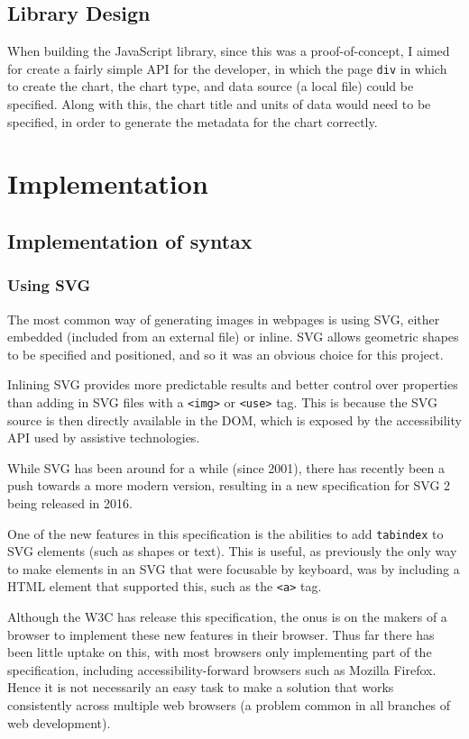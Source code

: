 \documentclass[ %
                    author={Aleena Baig},
                supervisor={Dr Simon Lock},
                    degree={BSc},
                     title={On Making Web Accessible Graphs},
                  subtitle={},
                      year={2019} ]{dissertation}
\begin{document}
\section{Library Design}

When building the JavaScript library, since this was a proof-of-concept, I aimed for create a fairly simple API for the developer, in which the page \texttt{div} in which to create the chart, the chart type, and data source (a local file) could be specified. Along with this, the chart title and units of data would need to be specified, in order to generate the metadata for the chart correctly.

\chapter{Implementation}

\section{Implementation of syntax}

\subsection{Using SVG}

The most common way of generating images in webpages is using SVG, either embedded (included from an external file) or inline. SVG allows geometric shapes to be specified and positioned, and so it was an obvious choice for this project.

Inlining SVG provides more predictable results and better control over properties than adding in SVG files with a \texttt{<img>} or \texttt{<use>} tag. This is because the SVG source is then directly available in the DOM, which is exposed by the accessibility API used by assistive technologies.

While SVG has been around for a while (since 2001), there has recently been a push towards a more modern version, resulting in a new specification for SVG 2 being released in 2016.

One of the new features in this specification is the abilities to add \texttt{tabindex} to SVG elements (such as shapes or text). This is useful, as previously the only way to make elements in an SVG that were focusable by keyboard, was by including a HTML element that supported this, such as the \texttt{<a>} tag.

Although the W3C has release this specification, the onus is on the makers of a browser to implement these new features in their browser. Thus far there has been little uptake on this, with most browsers only implementing part of the specification, including accessibility-forward browsers such as Mozilla Firefox. Hence it is not necessarily an easy task to make a solution that works consistently across multiple web browsers (a problem common in all branches of web development).
\end{document}
